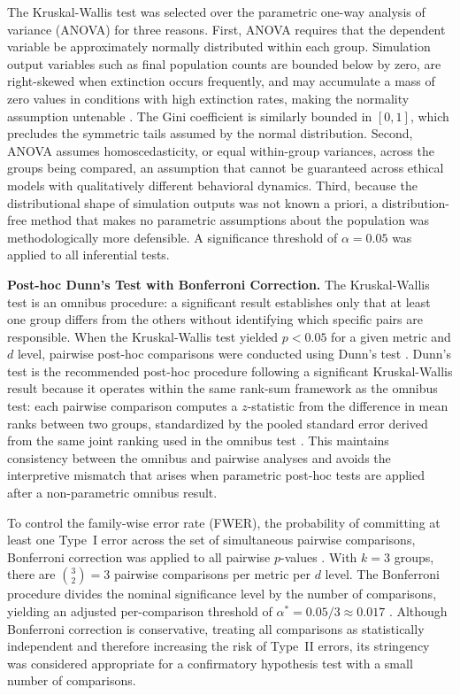 \documentclass{icsthesis}
\begin{document}
\begin{mainmatter}
			The Kruskal-Wallis test was selected over the parametric one-way analysis of variance (ANOVA) for three reasons. First, ANOVA requires that the dependent variable be approximately normally distributed within each group. Simulation output variables such as final population counts are bounded below by zero, are right-skewed when extinction occurs frequently, and may accumulate a mass of zero values in conditions with high extinction rates, making the normality assumption untenable \citep{Field2013}. The Gini coefficient is similarly bounded in $[0, 1]$, which precludes the symmetric tails assumed by the normal distribution. Second, ANOVA assumes homoscedasticity, or equal within-group variances, across the groups being compared, an assumption that cannot be guaranteed across ethical models with qualitatively different behavioral dynamics. Third, because the distributional shape of simulation outputs was not known a priori, a distribution-free method that makes no parametric assumptions about the population was methodologically more defensible. A significance threshold of $\alpha = 0.05$ was applied to all inferential tests.

			\textbf{Post-hoc Dunn's Test with Bonferroni Correction.}
			The Kruskal-Wallis test is an omnibus procedure: a significant result establishes only that at least one group differs from the others without identifying which specific pairs are responsible. When the Kruskal-Wallis test yielded $p < 0.05$ for a given metric and $d$ level, pairwise post-hoc comparisons were conducted using Dunn's test \citep{Dunn1964}. Dunn's test is the recommended post-hoc procedure following a significant Kruskal-Wallis result because it operates within the same rank-sum framework as the omnibus test: each pairwise comparison computes a $z$-statistic from the difference in mean ranks between two groups, standardized by the pooled standard error derived from the same joint ranking used in the omnibus test \citep{Dunn1964}. This maintains consistency between the omnibus and pairwise analyses and avoids the interpretive mismatch that arises when parametric post-hoc tests are applied after a non-parametric omnibus result.

			To control the family-wise error rate (FWER), the probability of committing at least one Type~I error across the set of simultaneous pairwise comparisons, Bonferroni correction was applied to all pairwise $p$-values \citep{Bonferroni1936}. With $k = 3$ groups, there are $\binom{3}{2} = 3$ pairwise comparisons per metric per $d$ level. The Bonferroni procedure divides the nominal significance level by the number of comparisons, yielding an adjusted per-comparison threshold of $\alpha^{*} = 0.05 / 3 \approx 0.017$ \citep{Dunn1961}. Although Bonferroni correction is conservative, treating all comparisons as statistically independent and therefore increasing the risk of Type~II errors, its stringency was considered appropriate for a confirmatory hypothesis test with a small number of comparisons.


\end{mainmatter}
\end{document}
